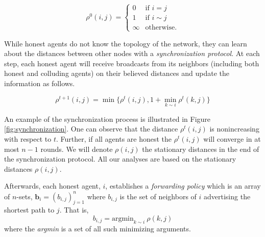 \documentclass[reprint]{revtex4-1}
\begin{document}
\begin{equation} \label{unifromd0}
   \rho^0(i,j) =
    \begin{cases}
        0 & \text{if } i = j \\
        1 & \text{if } i \sim j \\
        \infty & \text{otherwise.}
    \end{cases}
\end{equation}
 
While honest agents do not know the topology of the network, they can learn about the distances between other nodes with a {\it synchronization protocol}. At each step, each honest agent will receive broadcasts from its neighbors (including both honest and colluding agents) on their believed distances and update the information as follows.

\begin{equation}
   \rho^{t+1}(i,j) = \min \{ \rho^{t}(i,j), 1 + \min_{k \sim i} \rho^{t}(k,j) \} \label{uniformd}
\end{equation}




An example of the synchronization process is illustrated in Figure \ref{fig:synchronization}. One can observe that the distance $\rho^t(i,j)$ is nonincreasing with respect to $t$. Further, if all agents are honest the $\rho^t(i,j)$ will converge in at most $n-1$ rounds. We will denote $\rho(i,j)$ the stationary distances in the end of the synchronization protocol. All our analyses are based on the stationary distances $\rho(i,j)$.

Afterwards, each honest agent, $i$, establishes a {\it forwarding policy} which is an array of $n$-sets, $\mathbf{b}_{i} = (b_{i,j})_{j=1}^n$ where $b_{i,j}$ is the set of neighbors of $i$ advertising the shortest path to $j$. That is,
\begin{equation}
{b}_{i, j} =  \text{argmin}_{k \sim i} ~ \rho(k,j) \label {uniformb} 
\end{equation}
where the {\it argmin} is a set of all such minimizing arguments.
\end{document}
